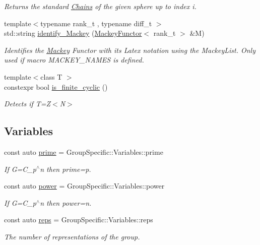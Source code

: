 \begin{DoxyCompactItemize}
\begin{DoxyCompactList}\small\item\em Returns the standard \hyperlink{classMackey_1_1Chains}{Chains} of the given sphere up to index i. \end{DoxyCompactList}\item 
{\footnotesize template$<$typename rank\+\_\+t , typename diff\+\_\+t $>$ }\\std\+::string \hyperlink{namespaceMackey_ad0ca46ae450950b13360c44a2de1cb43}{identify\+\_\+\+Mackey} (\hyperlink{classMackey_1_1MackeyFunctor}{Mackey\+Functor}$<$ rank\+\_\+t $>$ \&M)
\begin{DoxyCompactList}\small\item\em Identifies the \hyperlink{namespaceMackey}{Mackey} Functor with its Latex notation using the Mackey\+List. Only used if macro M\+A\+C\+K\+E\+Y\+\_\+\+N\+A\+M\+ES is defined. \end{DoxyCompactList}\item 
{\footnotesize template$<$class T $>$ }\\constexpr bool \hyperlink{namespaceMackey_afe8e1404c86fb9609734d3e0074ac7ed}{is\+\_\+finite\+\_\+cyclic} ()
\begin{DoxyCompactList}\small\item\em Detects if T=Z$<$\+N$>$ \end{DoxyCompactList}\end{DoxyCompactItemize}
\subsection*{Variables}
\begin{DoxyCompactItemize}
\item 
const auto \hyperlink{namespaceMackey_a77e059c6f9b4c6ea096fcf94a7880bc3}{prime} = Group\+Specific\+::\+Variables\+::prime
\begin{DoxyCompactList}\small\item\em If G=C\+\_\+p$^\wedge$n then prime=p. \end{DoxyCompactList}\item 
const auto \hyperlink{namespaceMackey_aafdaaabd06dd9ceefe6fa4f26d13a60d}{power} = Group\+Specific\+::\+Variables\+::power
\begin{DoxyCompactList}\small\item\em If G=C\+\_\+p$^\wedge$n then power=n. \end{DoxyCompactList}\item 
const auto \hyperlink{namespaceMackey_af282e8433677f2812cb242359f4cd0c1}{reps} = Group\+Specific\+::\+Variables\+::reps
\begin{DoxyCompactList}\small\item\em The number of representations of the group. \end{DoxyCompactList}\end{DoxyCompactItemize}


